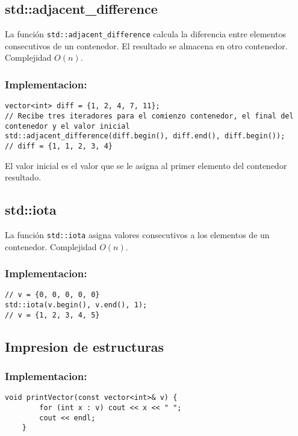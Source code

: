 \subsection{std::adjacent\_difference}
\label{subsec:std_adjacent_difference}
La función \texttt{std::adjacent\_difference} calcula la diferencia entre elementos consecutivos de un contenedor. El resultado se almacena en otro contenedor. Complejidad $O(n)$.

\subsubsection{Implementacion:}
\begin{lstlisting}
vector<int> diff = {1, 2, 4, 7, 11};
// Recibe tres iteradores para el comienzo contenedor, el final del contenedor y el valor inicial
std::adjacent_difference(diff.begin(), diff.end(), diff.begin());
// diff = {1, 1, 2, 3, 4}
\end{lstlisting}

El valor inicial es el valor que se le asigna al primer elemento del contenedor resultado.

\subsection{std::iota}
\label{subsec:std_iota}
La función \texttt{std::iota} asigna valores consecutivos a los elementos de un contenedor. Complejidad $O(n)$. 

\subsubsection{Implementacion:}
\begin{lstlisting}
// v = {0, 0, 0, 0, 0}
std::iota(v.begin(), v.end(), 1);
// v = {1, 2, 3, 4, 5}
\end{lstlisting}

\subsection{Impresion de estructuras}

\subsubsection{Implementacion:}
    \begin{lstlisting}[style=cpp]
    void printVector(const vector<int>& v) {
        for (int x : v) cout << x << " ";
        cout << endl;
    }
    \end{lstlisting}


